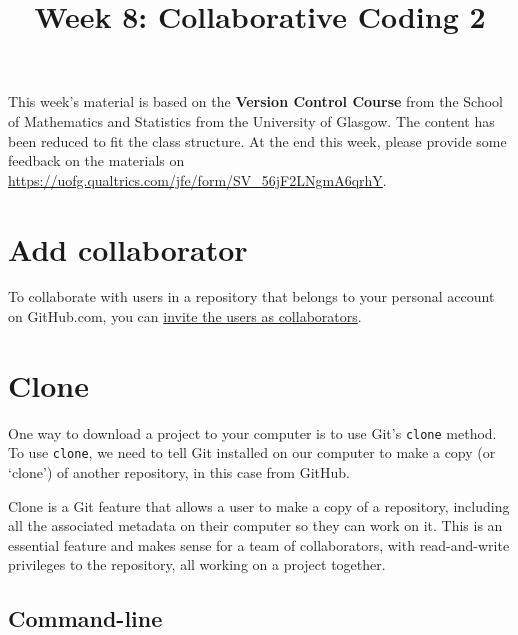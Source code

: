 \documentclass[
  letterpaper,
  DIV=11,
  numbers=noendperiod]{scrartcl}
\title{Week 8: Collaborative Coding 2}
\author{}
\date{}
\begin{document}
\maketitle
\ifdefined\Shaded\renewenvironment{Shaded}{\begin{tcolorbox}[interior hidden, sharp corners, boxrule=0pt, borderline west={3pt}{0pt}{shadecolor}, frame hidden, breakable, enhanced]}{\end{tcolorbox}}\fi

This week's material is based on the \textbf{Version Control Course}
from the School of Mathematics and Statistics from the University of
Glasgow. The content has been reduced to fit the class structure. At the
end this week, please provide some feedback on the materials on
\url{https://uofg.qualtrics.com/jfe/form/SV_56jF2LNgmA6qrhY}.

\hypertarget{add-collaborator}{%
\section{Add collaborator}\label{add-collaborator}}

To collaborate with users in a repository that belongs to your personal
account on GitHub.com, you can
\href{https://docs.github.com/en/account-and-profile/setting-up-and-managing-your-personal-account-on-github/managing-access-to-your-personal-repositories/inviting-collaborators-to-a-personal-repository}{invite
the users as collaborators}.

\hypertarget{clone}{%
\section{Clone}\label{clone}}

One way to download a project to your computer is to use Git's
\texttt{clone} method. To use \texttt{clone}, we need to tell Git
installed on our computer to make a copy (or `clone') of another
repository, in this case from GitHub.

Clone is a Git feature that allows a user to make a copy of a
repository, including all the associated metadata on their computer so
they can work on it. This is an essential feature and makes sense for a
team of collaborators, with read-and-write privileges to the repository,
all working on a project together.

\subsection{Command-line}
\end{document}
